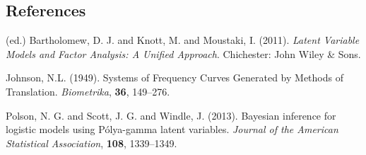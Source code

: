 \documentclass[12pt]{article}
\begin{document}
%        
%
%        

\subsection*{References}

\begin{description}

\item
(ed.) Bartholomew, D. J. and Knott, M. and Moustaki, I. (2011).
\textit{Latent Variable Models and Factor Analysis: A Unified Approach}. Chichester: John Wiley \& Sons.

\item
Johnson, N.L. (1949).
Systems of Frequency Curves Generated by Methods of Translation.
\textit{Biometrika}, \textbf{36}, 149--276.

\item
Polson, N. G. and Scott, J. G. and Windle, J. (2013).
Bayesian inference for logistic models using {P{\'o}lya}-gamma latent
	variables.
\textit{Journal of the American Statistical Association}, \textbf{108}, 1339--1349.



\end{description}
\end{document}
